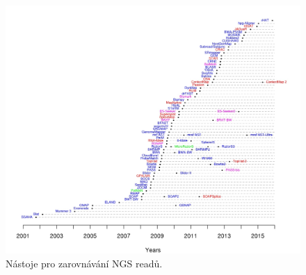 \documentclass[czech,DP]{thesiskiv}
\numberwithin{equation}{section}
\begin{document}
\begin{figure}[H]		
		\centering
		\includegraphics[width=1\textwidth]{./img/ngs_read_mappers.jpeg}
		\caption{Nástoje pro zarovnávání NGS readů. \cite{ngs_alignment_software}}
		\label{fig:read_simulators}
\end{figure}
\end{document}
